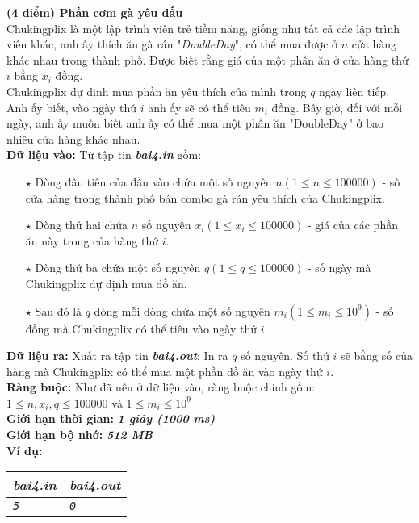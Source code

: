\begin{ex}
	\textbf{(4 điểm) Phần cơm gà yêu dấu}\\
	Chukingplix là một lập trình viên trẻ tiềm năng, giống như tất cả các lập trình viên khác, anh ấy thích ăn gà rán "\textit{DoubleDay}", có thể mua được ở $n$ cửa hàng khác nhau trong thành phố. Được biết rằng giá của một phần ăn ở cửa hàng thứ $i$ bằng $x_i$ đồng.\\
	Chukingplix dự định mua phần ăn yêu thích của mình trong $q$ ngày liên tiếp. Anh ấy biết, vào ngày thứ $i$ anh ấy sẽ có thể tiêu $m_i$ đồng. Bây giờ, đối với mỗi ngày, anh ấy muốn biết anh ấy có thể mua một phần ăn "DoubleDay" ở bao nhiêu cửa hàng khác nhau.\\
	\textbf{Dữ liệu vào: } Từ tập tin \textbf{\textit{bai4.in}} gồm: 
	\begin{itemize}
		\item[$\star$] Dòng đầu tiên của đầu vào chứa một số nguyên $n (1 \leq n \leq 100000)$ - số cửa hàng trong thành phố bán combo gà rán yêu thích của Chukingplix.
		\item[$\star$] Dòng thứ hai chứa $n$ số nguyên $x_i (1 \leq x_i \leq 100 000)$ - giá của các phần ăn này trong của hàng thứ $i$. 
		\item[$\star$] Dòng thứ ba chứa một số nguyên $q (1 \leq q \leq 100 000)$ - số ngày mà Chukingplix dự định mua đồ ăn. 
		\item[$\star$] Sau đó là $q$ dòng mỗi dòng chứa một số nguyên $m_i (1 \leq m_i \leq 10^9)$ - số đồng mà Chukingplix có thể tiêu vào ngày thứ $i$. 
	\end{itemize}
	\textbf{Dữ liệu ra: } Xuất ra tập tin \textbf{\textit{bai4.out}}: In ra $q$ số nguyên. Số thứ $i$ sẽ bằng số của hàng mà Chukingplix có thể mua một phần đồ ăn vào ngày thứ $i$. \\
	\textbf{Ràng buộc: } Như đã nêu ở dữ liệu vào, ràng buộc chính gồm: $1 \leq n, x_i, q \leq 100000$ và $1 \leq m_i \leq 10^9$\\
	\textbf{Giới hạn thời gian: } \textbf{\textit{1 giây (1000 ms)}} \\
	\textbf{Giới hạn bộ nhớ: } \textbf{\textit{512 MB}}\\
	\textbf{Ví dụ: }
	\begin{center}
		\begin{tabular}{|l|l|}
			\hline
			\textbf{\textsf{\textit{bai4.in}}} & \textbf{\textsf{\textit{bai4.out}}} \\ %
			\hline
			\textit{\texttt{5}} & \textit{\texttt{0}} \\ %

\end{tabular}
\end{center}
\end{ex}
